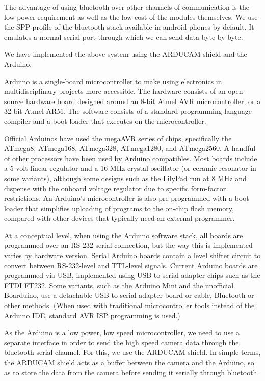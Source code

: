 \documentclass[11pt]{report}
\begin{document}
The advantage of using bluetooth over other channels of communication is the low power requirement as well as the low cost of the modules themselves. We use the SPP profile of the bluetooth stack available in android phones by default. It emulates a normal serial port through which we can send data byte by byte. 

We have implemented  the above system using the ARDUCAM shield and the Arduino.

Arduino is a single-board microcontroller to make using electronics in multidisciplinary projects more accessible. The hardware consists of an open-source hardware board designed around an 8-bit Atmel AVR microcontroller, or a 32-bit Atmel ARM. The software consists of a standard programming language compiler and a boot loader that executes on the microcontroller. 

Official Arduinos have used the megaAVR series of chips, specifically the ATmega8, ATmega168, ATmega328, ATmega1280, and ATmega2560. A handful of other processors have been used by Arduino compatibles. Most boards include a 5 volt linear regulator and a 16 MHz crystal oscillator (or ceramic resonator in some variants), although some designs such as the LilyPad run at 8 MHz and dispense with the onboard voltage regulator due to specific form-factor restrictions. An Arduino's microcontroller is also pre-programmed with a boot loader that simplifies uploading of programs to the on-chip flash memory, compared with other devices that typically need an external programmer.

At a conceptual level, when using the Arduino software stack, all boards are programmed over an RS-232 serial connection, but the way this is implemented varies by hardware version. Serial Arduino boards contain a level shifter circuit to convert between RS-232-level and TTL-level signals. Current Arduino boards are programmed via USB, implemented using USB-to-serial adapter chips such as the FTDI FT232. Some variants, such as the Arduino Mini and the unofficial Boarduino, use a detachable USB-to-serial adapter board or cable, Bluetooth or other methods. (When used with traditional microcontroller tools instead of the Arduino IDE, standard AVR ISP programming is used.)

As the Arduino is a low power, low speed microcontroller, we need to use a separate interface in order to send the high speed camera data through the bluetooth serial channel. For this, we use the ARDUCAM shield. In simple terms, the ARDUCAM shield acts as a buffer between the camera and the Arduino, so as to store the data from the camera before sending it serially through bluetooth.
\end{document}
